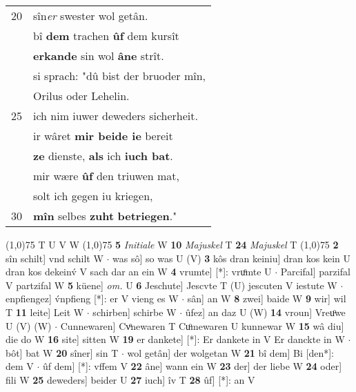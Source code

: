 \documentclass[8pt,a4paper,notitlepage]{article}
\begin{document}
\begin{table}[ht]
\begin{minipage}[t]{0.5\linewidth}
\begin{tabular}{rl}
20 & sîn\textit{er} swester wol getân.\\ 
 & bî \textbf{dem} trachen \textbf{ûf} dem kursît\\ 
 & \textbf{erkande} sin wol \textbf{âne} strît.\\ 
 & si sprach: "dû bist der bruoder mîn,\\ 
 & Orilus oder Lehelin.\\ 
25 & ich nim iuwer deweders sicherheit.\\ 
 & ir wâret \textbf{mir beide ie} bereit\\ 
 & \textbf{ze} dienste, \textbf{als} ich \textbf{iuch bat}.\\ 
 & mir wære \textbf{ûf} den triuwen mat,\\ 
 & solt ich gegen iu kriegen,\\ 
30 & \textbf{mîn} selbes \textbf{zuht} \textbf{betriegen}."\\ 
\end{tabular}
\scriptsize
\line(1,0){75} \newline
T U V W \newline
\line(1,0){75} \newline
\textbf{5} \textit{Initiale} W  \textbf{10} \textit{Majuskel} T  \textbf{24} \textit{Majuskel} T  \newline
\line(1,0){75} \newline
\textbf{2} sîn schilt] vnd schilt W  $\cdot$ was sô] so was U (V) \textbf{3} kôs dran keiniu] dran kos kein U dran kos dekeinv́ V sach dar an ein W \textbf{4} vrumte] [*]: vruͦmte U  $\cdot$ Parcifal] parzifal V partzifal W \textbf{5} küene] \textit{om.} U \textbf{6} Jeschute] Jescvte T (U) jescuten V iestute W  $\cdot$ enpfiengez] v́npfieng [*]: er V vieng es W  $\cdot$ sân] an W \textbf{8} zwei] baide W \textbf{9} wir] wil T \textbf{11} leite] Leit W  $\cdot$ schirben] schirbe W  $\cdot$ ûfez] an daz U (W) \textbf{14} vroun] Vreuͦwe U (V) (W)  $\cdot$ Cunnewaren] Cvͦnewaren T Cuͦmewaren U kunnewar W \textbf{15} wâ diu] die do W \textbf{16} site] sitten W \textbf{19} er dankete] [*]: Er dankete in V Er danckte in W  $\cdot$ bôt] bat W \textbf{20} sîner] sin T  $\cdot$ wol getân] der wolgetan W \textbf{21} bî dem] Bi [den*]: dem V  $\cdot$ ûf dem] [*]: vffem V \textbf{22} âne] wann ein W \textbf{23} der] der liebe W \textbf{24} oder] fili W \textbf{25} deweders] beider U \textbf{27} iuch] îv T \textbf{28} ûf] [*]: an V \newline
\end{minipage}
\end{table}
\end{document}
